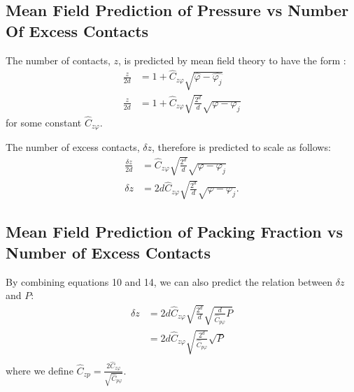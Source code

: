 \subsection{Mean Field Prediction of Pressure vs Number Of Excess Contacts}

The number of contacts, $z$, is predicted by mean field theory to have the form \cite{parisi_theory_2020}:
%
\begin{align}
\frac{z}{2d} &=1 + \hat{C}_{z\varphi}\sqrt{\hat{\varphi}-\hat{\varphi_j}} \\
\frac{z}{2d} &=1 + \hat{C}_{z\varphi}\sqrt{\frac{2^d}{d}}\sqrt{\varphi-\varphi_j} \label{eqn:meanFieldExcessPhi}
\end{align}
%
for some constant $\hat{C}_{z\varphi}$. 

The number of excess contacts, $\delta z$, therefore is predicted to scale as follows:
\begin{align}
\frac{\delta z}{2d} &= \hat{C}_{z\varphi}\sqrt{\frac{2^d}{d}}\sqrt{\varphi - \varphi_j} \\ %
\delta z &= 2d\hat{C}_{z\varphi}\sqrt{\frac{2^d}{d}}\sqrt{\varphi - \varphi_j} \label{supeqn:finalphivsz}.
\end{align}


\subsection{Mean Field Prediction of Packing Fraction vs Number of Excess Contacts}

By combining equations 10
and 14,
we can also predict the relation between $\delta z$ and $P$:
%
\begin{align}
 \delta z &= 2d\hat{C}_{z\varphi}\sqrt{\frac{2^d}{d}} \sqrt{\frac{d}{\hat{C}_{p\varphi}}P} \\
 &= 2d\hat{C}_{z\varphi}\sqrt{\frac{2^d}{\hat{C}_{p\varphi}}} \sqrt{P} \\
\end{align}
%
where we define $\hat{C}_{zp}=\frac{2\hat{C}_{z\varphi}}{\sqrt{\hat{C}_{p\varphi}}}$.

